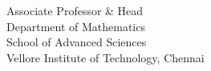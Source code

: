 \vspace{3\baselineskip}

\begin{minipage}[b]{.5\textwidth}
	~
\end{minipage}%
\begin{minipage}[b]{.5\textwidth}
	\centering
	
	\textbf{\textsc{\thehod}}\\
	Associate Professor \& Head\\
	Department of Mathematics\\
	School of Advanced Sciences\\
	Vellore Institute of Technology, Chennai
	
\end{minipage}

\endgroup
\raggedbottom
\cleardoublepage
%
%  